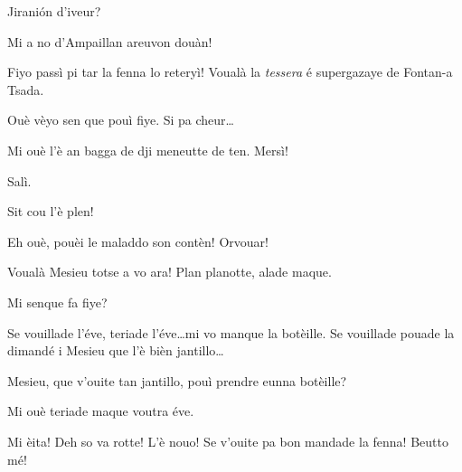 \begin{drama}
\Lucianospeaks Jirani\'on d'iveur?

\Prosperospeaks Mi a no d'Ampaillan areuvon douàn!

\Lucianospeaks{} Fiyo passì pi tar la fenna lo reteryì!  Voualà la \textit{tessera} é supergazaye de Fontan-a Tsada.

\Prosperospeaks Ouè vèyo sen que pouì fiye. Si pa cheur\ldots 

\Lucianospeaks Mi ouè l'è an bagga de dji meneutte de ten. Mersì!

\Prosperospeaks Salì.


\Prosperospeaks{} Sit cou l'è plen!

\Volonterospeaks Eh ouè, pouèi le maladdo son contèn! Orvouar!



\Valletspeaks{}  Voualà Mesieu totse a vo ara! Plan planotte, alade maque.


\Vetchotspeaks{} Mi senque fa fiye?

\Valletspeaks Se vouillade l'éve, teriade l'éve\ldots mi vo manque la botèille. Se vouillade pouade la dimandé i Mesieu  que l'è bièn jantillo\ldots


\Vetchotspeaks {} Mesieu, que v'ouite tan jantillo, pouì prendre eunna botèille?

\Prosperospeaks{} Mi ouè teriade maque voutra éve.


\Prosperospeaks Mi èita! Deh so va rotte! L'è nouo! Se v'ouite pa bon mandade la fenna! Beutto mé!



\end{drama}
